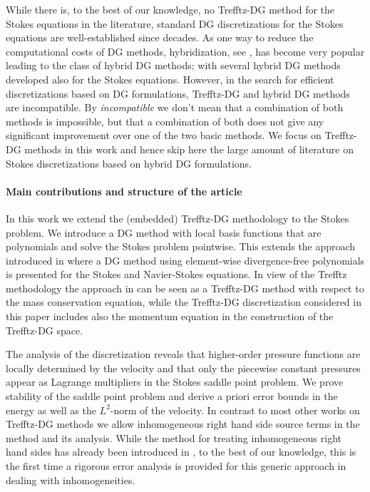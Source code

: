 \documentclass[pdflatex,sn-mathphys,Numbered]{sn-jnl}%
\theoremstyle{remark}%
\theoremstyle{definition}%
\begin{document}
While there is, to the best of our knowledge, no Trefftz-DG method for
the Stokes equations in the literature, standard DG discretizations
for the Stokes equations are well-established since decades. As one
way to reduce the computational costs of DG methods, hybridization,
see \cite{cockburn2009unified}, has become very popular leading to the
class of hybrid DG methods; with several hybrid DG methods developed
also for the Stokes equations. However, in the search for efficient
discretizations based on DG formulations, Trefftz-DG and hybrid DG
methods are incompatible. By \emph{incompatible} we don't mean that a
combination of both methods is impossible, but that a combination of
both does not give any significant improvement over one of the two
basic methods. We focus on Trefftz-DG methods in this work and hence
skip here the large amount of literature on Stokes discretizations
based on hybrid DG formulations. 

\paragraph*{Main contributions and structure of the article}
In this work we extend the (embedded) Trefftz-DG methodology to the
Stokes problem. We introduce a DG method with local basis functions
that are polynomials and solve the Stokes problem pointwise. This
extends the approach introduced in
\cite{montlaur2010discontinuous,montlaur08} where a DG method using
element-wise divergence-free polynomials is presented for the Stokes
and Navier-Stokes equations. In view of the Trefftz methodology the
approach in \cite{montlaur2010discontinuous,montlaur08} can be seen as
a Trefftz-DG method with respect to the mass conservation equation,
while the Trefftz-DG discretization considered in this paper includes
also the momentum equation in the construction of the Trefftz-DG
space. 

The analysis of the discretization reveals that higher-order pressure
functions are locally determined by the velocity and that only the
piecewise constant pressures appear as Lagrange multipliers in the
Stokes saddle point problem. We prove stability of the saddle point
problem and derive a priori error bounds in the energy as well as the
$L^2$-norm of the velocity. In contrast to most other works on
Trefftz-DG methods we allow inhomogeneous right hand side source terms
in the method and its analysis. While the method for treating
inhomogeneous right hand sides has already been introduced in
\cite{2201.07041}, to the best of our knowledge, this is the first
time a rigorous error analysis is provided for this generic approach
in dealing with inhomogeneities.
\end{document}
